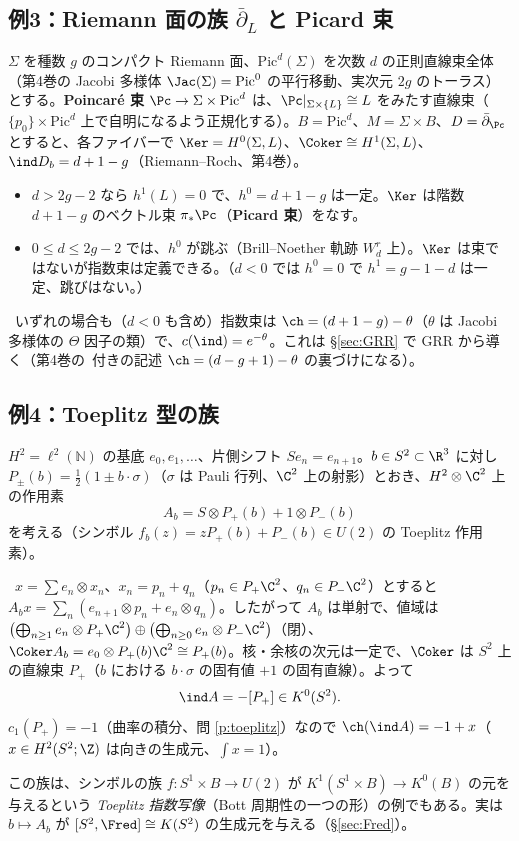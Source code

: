 \subsection{例3：Riemann 面の族 $\bar\partial_L$ と Picard 束}
$\Sigma$ を種数 $g$ のコンパクト Riemann 面、$\mathrm{Pic}^d(\Sigma)$ を次数 $d$ の正則直線束全体（第4巻の Jacobi 多様体 $\Jac(\Sigma)=\mathrm{Pic}^0$ の平行移動、実次元 $2g$ のトーラス）とする。\textbf{Poincaré 束} $\Pc\to\Sigma\times\mathrm{Pic}^d$ は、$\Pc|_{\Sigma\times\{L\}}\cong L$ をみたす直線束（$\{p_0\}\times\mathrm{Pic}^d$ 上で自明になるよう正規化する）。$B=\mathrm{Pic}^d$、$M=\Sigma\times B$、$D=\bar\partial_{\Pc}$ とすると、各ファイバーで $\Ker=H^0(\Sigma,L)$、$\Coker\cong H^1(\Sigma,L)$、$\ind D_b=d+1-g$（Riemann--Roch、第4巻）。
\begin{itemize}
\item $d>2g-2$ なら $h^1(L)=0$ で、$h^0=d+1-g$ は一定。$\Ker$ は階数 $d+1-g$ のベクトル束 $\pi_*\Pc$（\textbf{Picard 束}）をなす。
\item $0\le d\le2g-2$ では、$h^0$ が跳ぶ（Brill--Noether 軌跡 $W^r_d$ 上）。$\Ker$ は束ではないが指数束は定義できる。（$d<0$ では $h^0=0$ で $h^1=g-1-d$ は一定、跳びはない。）
\end{itemize}
\tC\ いずれの場合も（$d<0$ も含め）指数束は $\ch=(d+1-g)-\theta$（$\theta$ は Jacobi 多様体の $\Theta$ 因子の類）で、$c(\ind)=e^{-\theta}$。これは \S\ref{sec:GRR} で GRR から導く（第4巻の\tQ\ 付きの記述 $\ch=(d-g+1)-\theta$ の裏づけになる）。

\subsection{例4：Toeplitz 型の族}
$H^2=\ell^2(\mathbb N)$ の基底 $e_0,e_1,\dots$、片側シフト $Se_n=e_{n+1}$。$b\in S^2\subset\R^3$ に対し $P_\pm(b)=\frac12(1\pm b\cdot\sigma)$（$\sigma$ は Pauli 行列、$\C^2$ 上の射影）とおき、$H^2\otimes\C^2$ 上の作用素
\[
A_b=S\otimes P_+(b)+1\otimes P_-(b)
\]
を考える（シンボル $f_b(z)=zP_+(b)+P_-(b)\in U(2)$ の Toeplitz 作用素）。
\begin{ex}\label{ex:toeplitzS2}\tP\
$x=\sum e_n\otimes x_n$、$x_n=p_n+q_n$（$p_n\in P_+\C^2$、$q_n\in P_-\C^2$）とすると $A_bx=\sum_n(e_{n+1}\otimes p_n+e_n\otimes q_n)$。したがって $A_b$ は単射で、値域は $\bigl(\bigoplus_{n\ge1}e_n\otimes P_+\C^2\bigr)\oplus\bigl(\bigoplus_{n\ge0}e_n\otimes P_-\C^2\bigr)$（閉）、$\Coker A_b=e_0\otimes P_+(b)\C^2\cong P_+(b)$。核・余核の次元は一定で、$\Coker$ は $S^2$ 上の直線束 $P_+$（$b$ における $b\cdot\sigma$ の固有値 $+1$ の固有直線）。よって
\[
\ind A=-[P_+]\in K^0(S^2).
\]
$c_1(P_+)=-1$（曲率の積分、問 \ref{p:toeplitz}）なので $\ch(\ind A)=-1+x$（$x\in H^2(S^2;\Z)$ は向きの生成元、$\int x=1$）。
\end{ex}
この族は、シンボルの族 $f:S^1\times B\to U(2)$ が $K^1(S^1\times B)\to K^0(B)$ の元を与えるという \emph{Toeplitz 指数写像}（Bott 周期性の一つの形）の例でもある。実は $b\mapsto A_b$ が $[S^2,\Fred]\cong K(S^2)$ の生成元を与える（\S\ref{sec:Fred}）。

